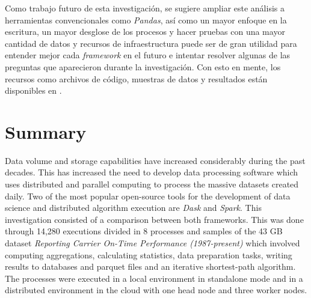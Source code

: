\documentclass[11pt, oneside]{book}
\begin{document}
Como trabajo futuro de esta investigación, se sugiere ampliar este análisis a herramientas convencionales como \textit{Pandas}, así como un mayor enfoque en la escritura, un mayor desglose de los procesos y hacer pruebas con una mayor cantidad de datos y recursos de infraestructura puede ser de gran utilidad para entender mejor cada \textit{framework} en el futuro e intentar resolver algunas de las preguntas que aparecieron durante la investigación. Con esto en mente, los recursos como archivos de código, muestras de datos y resultados están disponibles en \cite{repo-spark-rita}.

\pagestyle{plain}

\noindent 


\chapter*{Summary}

\noindent Data volume and storage capabilities have increased considerably during the past decades. This has increased the need to develop data processing software which uses distributed and parallel computing to process the massive datasets created daily. Two of the most popular open-source tools for the development of data science and distributed algorithm execution are \textit{Dask} and \textit{Spark}. This investigation consisted of a comparison between both frameworks. This was done through 14,280 executions divided in 8 processes and samples of the 43 GB dataset \textit{Reporting Carrier On-Time Performance (1987-present)} which involved computing aggregations, calculating statistics, data preparation tasks, writing results to databases and parquet files and an iterative shortest-path algorithm. The processes were executed in a local environment in standalone mode and in a distributed environment in the cloud with one head node and three worker nodes.
\end{document}

